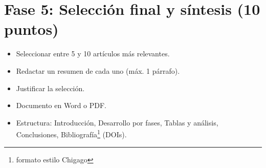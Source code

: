 \documentclass[12pt]{article}
\begin{document}
\section*{Fase 5: Selección final y síntesis (10 puntos)}
\begin{itemize}
  \item Seleccionar entre 5 y 10 artículos más relevantes.
  \item Redactar un resumen de cada uno (máx. 1 párrafo).
  \item Justificar la selección.
\end{itemize}


  \begin{tcolorbox}[colback=green!20!white,colframe=black,title=Formato de entrega]
\begin{itemize}
  \item Documento en Word o PDF.
  \item Estructura: Introducción, Desarrollo por fases, Tablas y análisis, Conclusiones, Bibliografía\footnote{formato estilo Chigago} (DOIs).
\end{itemize}
\end{tcolorbox}
\end{document}
